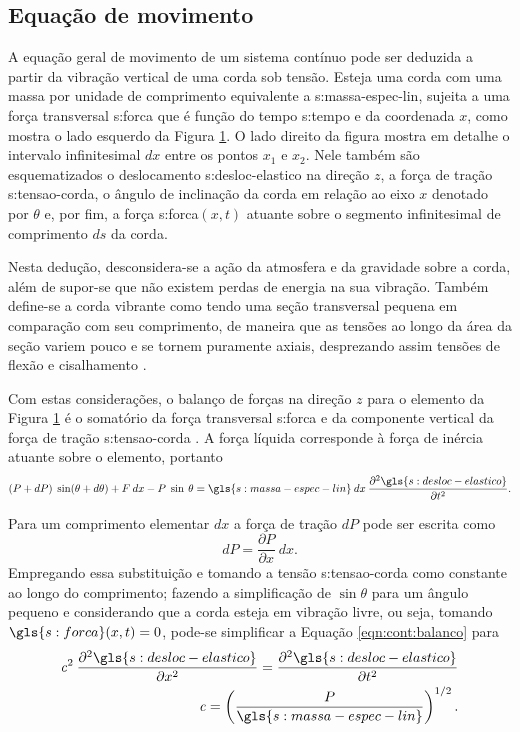 \documentclass[12pt,oneside,english,brazil,lmodern,siglas,simbolos,cite=num]{ucsmonograph}
\begin{document}
	\subsection{Equação de movimento}
	A equação geral de movimento de um sistema contínuo pode ser deduzida a partir da vibração vertical de uma corda sob tensão.
	Esteja uma corda com uma massa por unidade de comprimento equivalente a \gls{s:massa-espec-lin}, sujeita a uma força transversal \gls{s:forca} que é função do tempo \gls{s:tempo} e da coordenada $x$, como mostra o lado esquerdo da Figura \ref{fig:vibracao-corda}.
	O lado direito da figura mostra em detalhe o intervalo infinitesimal $dx$ entre os pontos $x_1$ e $x_2$.
	Nele também são esquematizados o deslocamento \gls{s:desloc-elastico} na direção $z$, a força de tração \gls{s:tensao-corda}, o ângulo de inclinação da corda em relação ao eixo $x$ denotado por $ \theta $ e, por fim, a força \gls{s:forca}$(x,t)$ atuante sobre o segmento infinitesimal de comprimento $ds$ da corda.
	\begin{figure}[t] 
	 \label{fig:vibracao-corda}
	\end{figure}

	Nesta dedução, desconsidera-se a ação da atmosfera e da gravidade sobre a corda, além de supor-se que não existem perdas de energia na sua vibração.
	Também define-se a corda vibrante como tendo uma seção transversal pequena em comparação com seu comprimento, de maneira que as tensões ao longo da área da seção variem pouco e se tornem puramente axiais, desprezando assim tensões de flexão e cisalhamento \cite{clark:1972}.
	
	Com estas considerações, o balanço de forças na direção $z$ para o elemento da Figura \ref{fig:vibracao-corda} é o somatório da força transversal \gls{s:forca} e da componente vertical da força de tração \gls{s:tensao-corda} \cite{rao:2008}.
	A força líquida corresponde à força de inércia atuante sobre o elemento, portanto
	\begin{equation} \label{eqn:cont:balanco}
		(P + dP)\;\sin(\theta + d\theta) + F\:dx - P\;\sin\:\theta =
		\gls{s:massa-espec-lin}\:dx\:\frac{\partial^2 \gls{s:desloc-elastico}}
		{\partial t^2}.
	\end{equation}
	
	Para um comprimento elementar $dx$ a força de tração $dP$ pode ser escrita como \[dP = \frac{\partial P}{\partial x}\:dx.\] 
	Empregando essa substituição e tomando a tensão \gls{s:tensao-corda} como constante ao longo do comprimento; fazendo a simplificação de $\sin\theta$ para um ângulo pequeno e considerando que a corda esteja em vibração livre, ou seja, tomando $\gls{s:forca}(x,t) = 0$, pode-se simplificar a Equação \ref{eqn:cont:balanco} para
	\begin{align}
		\mathit{c}^2\:\frac{\partial^2
		\gls{s:desloc-elastico}}{\partial x^2}=\frac{\partial^2
		\gls{s:desloc-elastico}}{\partial t^2} \label{eqn:cont:onda}\\
		\mathit{c} = \left(\frac{P}{\gls{s:massa-espec-lin}}\right)^{1/2}.
	\end{align}
	
\end{document}
